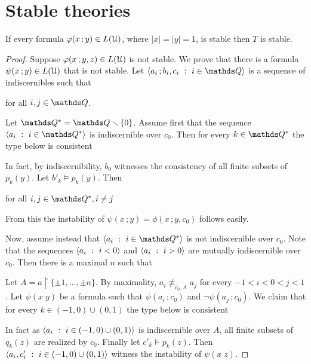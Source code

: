 
\section{Stable theories}
\label{stable_theories}

\begin{theorem}
  If every formula $\varphi(x\,;y)\in L(\EuScript U)$, where $|x|=|y|=1$, is stable then $T$ is stable.
\end{theorem} 

\begin{proof}
  Suppose $\varphi(x\,;y,z)\in L(\EuScript U)$ is not stable.
  We prove that there is a formula $\psi(x\,;y)\in L(\EuScript U)$ that is not stable.
  Let $\<a_i\,;b_i,c_i\ :\ i\in\QQ\>$ is a sequence of indiscernibles such that 

  \hfill for all $i,j\in\QQ$.

  Let $\QQ^*=\QQ\sm\{0\}$.
  Assume first that the sequence $\<a_i\ :\ i\in\QQ^*\>$ is indiscernible over $c_0$.
  Then for every $k\in\QQ^*$ the type below is consistent


  In fact, by indiscernibility, $b_0$ witnesses the consistency of all finite subsets of $p_k(y)$.
  Let $b'_k\models p_k(y)$.
  Then

  \hfill for all $i,j\in\QQ^*, i\neq j$

  From this the instability of $\psi(x\,;y)=\phi(x\,;y,c_0)$ follows easily.

  Now, assume instead that $\<a_i\ :\ i\in\QQ^*\>$ is not indiscernible over $c_0$.
  Note that the sequences $\<a_i\ :\ i<0\>$ and $\<a_i\ :\ i>0\>$ are mutually indiscernible over $c_0$.
  Then there is a maximal $n$ such that


  Let $A=a\restriction\{\pm1,\dots,\pm n\}$.
  By maximality, $a_i\nequiv_{c_0,A}a_j$ for every $-1<i<0<j<1$.
  Let $\psi(x\;y)$ be a formula such that $\psi(a_i\,;c_0)$ and $\neg\psi(a_j\,;c_0)$.
  We claim that for every $k\in(-1,0)\cup(0,1)$ the type below is consistent


  In fact as $\<a_i\ :\ i\in(-1,0)\cup(0,1)\>$ is indiscernible over $A$, all finite subsets of $q_k(z)$ are realized by $c_0$.
  Finally let $c'_k\models p_k(z)$.
  Then $\<a_i,c'_i\ :\ i\in(-1,0)\cup(0,1)\>$ witness the instability of $\psi(x\;z)$.
\end{proof}

